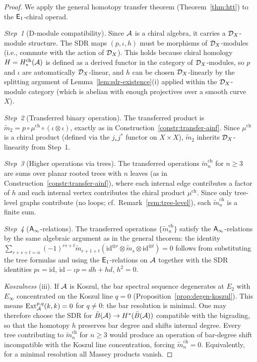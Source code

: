 \begin{proof}
We apply the general homotopy transfer theorem (Theorem~\ref{thm:htt}) to the $\mathsf{E}_1$-chiral operad.

\emph{Step~1} (D-module compatibility). Since $\mathcal{A}$ is a chiral algebra, it carries a $\mathcal{D}_X$-module structure.  The SDR maps $(p, \iota, h)$ must be morphisms of $\mathcal{D}_X$-modules (i.e., commute with the action of $\mathcal{D}_X$).  This holds because chiral homology $H = H^{\mathrm{ch}}_*(\mathcal{A})$ is defined as a derived functor in the category of $\mathcal{D}_X$-modules, so $p$ and $\iota$ are automatically $\mathcal{D}_X$-linear, and $h$ can be chosen $\mathcal{D}_X$-linearly by the splitting argument of Lemma~\ref{lem:sdr-existence}(i) applied within the $\mathcal{D}_X$-module category (which is abelian with enough projectives over a smooth curve~$X$).

\emph{Step~2} (Transferred binary operation). The transferred product is $\tilde{m}_2 = p \circ \mu^{\mathrm{ch}} \circ (\iota \otimes \iota)$, exactly as in Construction~\ref{constr:transfer-ainf}.  Since $\mu^{\mathrm{ch}}$ is a chiral product (defined via the $j_*j^*$ functor on $X \times X$), $\tilde{m}_2$ inherits $\mathcal{D}_X$-linearity from Step~1.

\emph{Step~3} (Higher operations via trees). The transferred operations $\tilde{m}_n^{\mathrm{ch}}$ for $n \geq 3$ are sums over planar rooted trees with $n$ leaves (as in Construction~\ref{constr:transfer-ainf}), where each internal edge contributes a factor of $h$ and each internal vertex contributes the chiral product $\mu^{\mathrm{ch}}$.  Since only tree-level graphs contribute (no loops; cf.\ Remark~\ref{rem:tree-level}), each $\tilde{m}_n^{\mathrm{ch}}$ is a finite sum.

\emph{Step~4} ($\mathsf{A}_{\infty}$-relations). The transferred operations $\{\tilde{m}_n^{\mathrm{ch}}\}$ satisfy the $\mathsf{A}_{\infty}$-relations by the same algebraic argument as in the general theorem: the identity $\sum_{r+s+t=n}(-1)^{rs+t}\tilde{m}_{r+1+t}(\mathrm{id}^{\otimes r} \otimes \tilde{m}_s \otimes \mathrm{id}^{\otimes t}) = 0$ follows from substituting the tree formulas and using the $\mathsf{E}_1$-relations on $\mathcal{A}$ together with the SDR identities $p\iota = \mathrm{id}$, $\mathrm{id} - \iota p = dh + hd$, $h^2 = 0$.

\emph{Koszulness} (iii). If $\mathcal{A}$ is Koszul, the bar spectral sequence degenerates at $E_2$ with $E_\infty$ concentrated on the Koszul line $q = 0$ (Proposition~\ref{prop:degen-koszul}).  This means $\mathrm{Ext}^{p,q}_{\mathcal{A}}(k,k) = 0$ for $q \neq 0$: the bar resolution is minimal.  One may therefore choose the SDR for $\bar{B}(\mathcal{A}) \to H^*(\bar{B}(\mathcal{A}))$ compatible with the bigrading, so that the homotopy $h$ preserves bar degree and shifts internal degree.  Every tree contributing to $\tilde{m}_n^{\mathrm{ch}}$ for $n \geq 3$ would produce an operation of bar-degree shift incompatible with the Koszul line concentration, forcing $\tilde{m}_n^{\mathrm{ch}} = 0$.  Equivalently, for a minimal resolution all Massey products vanish.
\end{proof}

